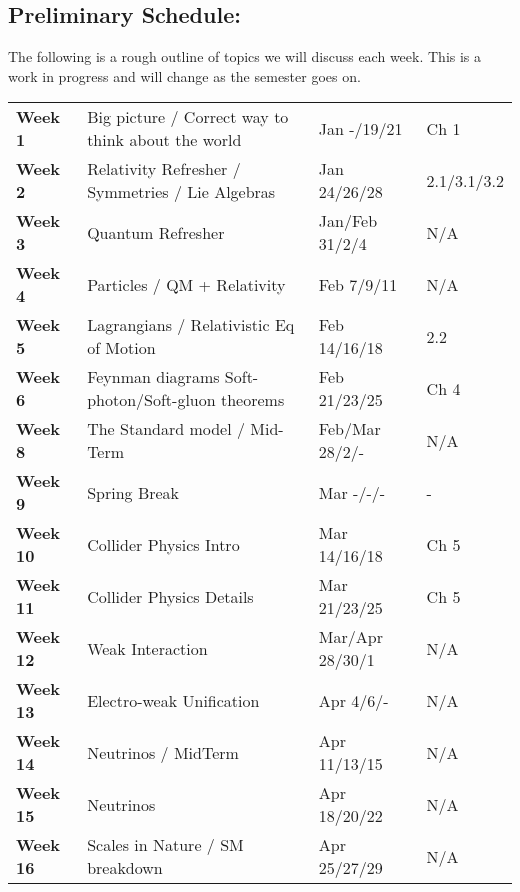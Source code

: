 \documentclass[margin,line]{res}
\begin{document}
\begin{resume}
\section{Preliminary Schedule:}

The following is a rough outline of topics we will discuss each week. 
This is a work in progress and will change as the semester goes on.

\begin{tabular}{llll}
\textbf{Week 1}  & Big picture / Correct way to think about the world & Jan -/19/21 & Ch 1\\
\textbf{Week 2}  & Relativity Refresher / Symmetries /  Lie Algebras & Jan 24/26/28 & 2.1/3.1/3.2\\
\textbf{Week 3}  & Quantum Refresher  & Jan/Feb 31/2/4 & N/A\\
\textbf{Week 4}  & Particles / QM + Relativity & Feb 7/9/11 & N/A\\
\textbf{Week 5}  & Lagrangians / Relativistic Eq of Motion & Feb 14/16/18 & 2.2\\
\textbf{Week 6}  & Feynman diagrams  Soft-photon/Soft-gluon theorems & Feb 21/23/25 & Ch 4\\
\textbf{Week 8}  & The Standard model / Mid-Term & Feb/Mar 28/2/- & N/A\\
\textbf{Week 9}  & Spring Break & Mar -/-/- & - \\
\textbf{Week 10} & Collider Physics Intro & Mar 14/16/18 & Ch 5 \\
\textbf{Week 11} & Collider Physics Details & Mar 21/23/25 & Ch 5\\
\textbf{Week 12} & Weak Interaction  & Mar/Apr 28/30/1 & N/A\\
\textbf{Week 13} & Electro-weak Unification & Apr 4/6/- & N/A\\
\textbf{Week 14} & Neutrinos / MidTerm & Apr 11/13/15 & N/A\\
\textbf{Week 15} & Neutrinos & Apr 18/20/22 & N/A \\
\textbf{Week 16} & Scales in Nature / SM breakdown  & Apr 25/27/29 & N/A\\
\end{tabular}

\end{resume}
\end{document}
